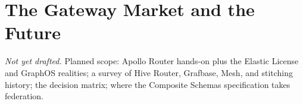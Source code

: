 \chapter{The Gateway Market and the Future}
\label{ch:the-gateway-market-and-the-future}

\emph{Not yet drafted.} Planned scope: Apollo Router hands-on plus the Elastic License and GraphOS realities; a survey of Hive Router, Grafbase, Mesh, and stitching history; the decision matrix; where the Composite Schemas specification takes federation.

% 
